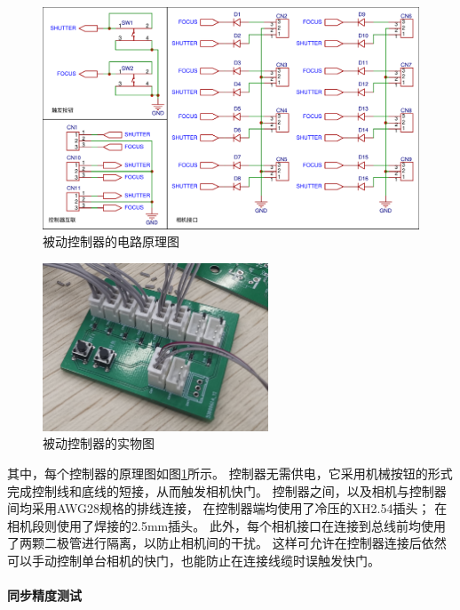 \begin{figure}
\includegraphics[width=\textwidth]{figures/passive_sync_schematic}
\caption{被动控制器的电路原理图}
\label{fig:passive_sync_schematic}
\end{figure}

\begin{figure}
\centering
\includegraphics[height=5cm]{figures/passive_sync_controller}
\caption{被动控制器的实物图}
\end{figure}

其中，每个控制器的原理图如图\ref{fig:passive_sync_schematic}所示。
控制器无需供电，它采用机械按钮的形式完成控制线和底线的短接，从而触发相机快门。
控制器之间，以及相机与控制器间均采用AWG28规格的排线连接，
在控制器端均使用了冷压的XH2.54插头；
在相机段则使用了焊接的2.5mm插头。
此外，每个相机接口在连接到总线前均使用了两颗二极管进行隔离，以防止相机间的干扰。
这样可允许在控制器连接后依然可以手动控制单台相机的快门，也能防止在连接线缆时误触发快门。

\paragraph{同步精度测试}

